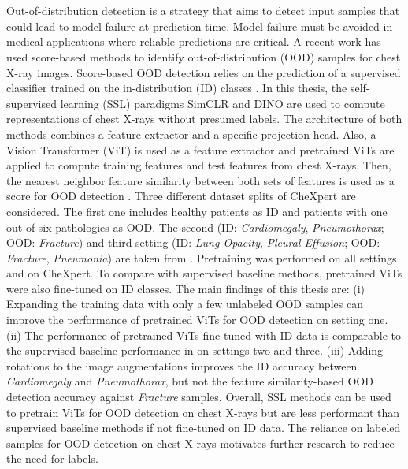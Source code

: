 \section*{}
Out-of-distribution detection is a strategy that aims to detect input samples that could lead to model failure at prediction time.
Model failure must be avoided in medical applications where reliable predictions are critical.
A recent work \citep{Berger2021} has used score-based methods to identify out-of-distribution (OOD) samples for chest X-ray images.
Score-based OOD detection relies on the prediction of a supervised classifier trained on the in-distribution (ID) classes \citep{Yang2021}.
In this thesis, the self-supervised learning (SSL) paradigms SimCLR \citep{Chen2020} and DINO \citep{Caron2021} are used to compute representations of chest X-rays without presumed labels.
The architecture of both methods combines a feature extractor and a specific projection head.
Also, a Vision Transformer (ViT) \citep{Dosovitskiy2020} is used as a feature extractor and pretrained ViTs are applied to compute training features and test features from chest X-rays.
Then, the nearest neighbor feature similarity between both sets of features is used as a score for OOD detection \citep{Michels2023,Sun2022}.
Three different dataset splits of CheXpert \citep{Irvin2019} are considered.
The first one includes healthy patients as ID and patients with one out of six pathologies as OOD.
The second (ID: \textit{Cardiomegaly}, \textit{Pneumothorax}; OOD: \textit{Fracture}) and third setting (ID: \textit{Lung Opacity}, \textit{Pleural Effusion}; OOD: \textit{Fracture}, \textit{Pneumonia}) are taken from \citep{Berger2021}.
Pretraining was performed on all settings and on CheXpert.
To compare with supervised baseline methods, pretrained ViTs were also fine-tuned on ID classes.
The main findings of this thesis are:
(i) Expanding the training data with only a few unlabeled OOD samples can improve the performance of pretrained ViTs for OOD detection on setting one.
(ii) The performance of pretrained ViTs fine-tuned with ID data is comparable to the supervised baseline performance in \citep{Berger2021} on settings two and three.
(iii) Adding rotations to the image augmentations improves the ID accuracy between \textit{Cardiomegaly} and \textit{Pneumothorax}, but not the feature similarity-based OOD detection accuracy against \textit{Fracture} samples.
Overall, SSL methods can be used to pretrain ViTs for OOD detection on chest X-rays but are less performant than supervised baseline methods if not fine-tuned on ID data.
The reliance on labeled samples for OOD detection on chest X-rays motivates further research to reduce the need for labels.
